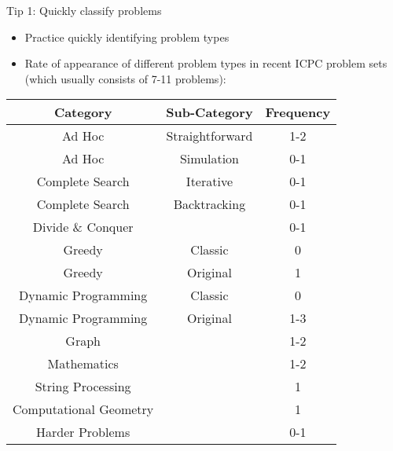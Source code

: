 \documentclass[10pt]{beamer}
\newcommand{\bi}{\begin{itemize}}
\newcommand{\ei}{\end{itemize}}
\begin{document}
\begin{frame}{Tip 1: Quickly classify problems}
    \bi
        \item Practice quickly identifying problem types
        \vspace{10pt}
        \item Rate of appearance of different problem types in recent ICPC problem sets (which usually consists of 7-11 problems):
    \ei

    \vspace{5pt}

{
    \scriptsize
        \begin{center}
            \begin{tabular}{ccc}
                Category & Sub-Category & Frequency \\
                \hline
                Ad Hoc & Straightforward & 1-2 \\
                Ad Hoc & Simulation & 0-1 \\
                Complete Search & Iterative & 0-1 \\
                Complete Search & Backtracking & 0-1 \\
                Divide \&{} Conquer & & 0-1 \\
                Greedy & Classic & 0 \\
                Greedy & Original & 1 \\
                Dynamic Programming & Classic & 0 \\
                Dynamic Programming & Original & 1-3 \\
                Graph &  & 1-2 \\
                Mathematics &  & 1-2 \\
                String Processing &  & 1 \\
                Computational Geometry &  & 1 \\
                Harder Problems &  & 0-1 \\
            \end{tabular}
        \end{center}
}
\end{frame}
\end{document}
